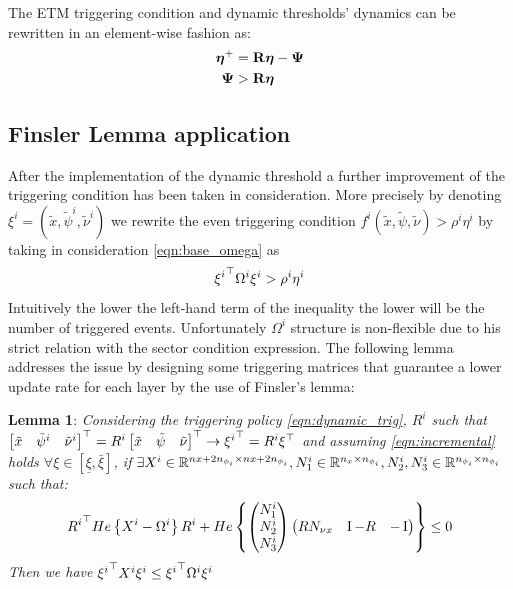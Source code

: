 \documentclass{article}
\begin{document}
The ETM triggering condition and dynamic thresholds' dynamics can be rewritten in an element-wise fashion as:
\begin{equation}
\begin{aligned}
    \boldsymbol{\eta}^+ &= {\bf{R}} \boldsymbol{\eta} - \mathbf{\Psi}\\
    \mathbf{\Psi} &> {\bf{R}} \boldsymbol{\eta}
\end{aligned}
\end{equation}

\subsection{Finsler Lemma application}
After the implementation of the dynamic threshold a further improvement of the triggering condition has been taken in consideration. More precisely by denoting $\xi^i = (\tilde{x}, \tilde{\psi}^i, \tilde{\nu}^i)$ we rewrite the even triggering condition $f^i(\tilde{x}, \tilde{\psi}, \tilde{\nu}) > \rho^i \eta^i$ by taking in consideration \ref{eqn:base_omega} as 
\begin{equation}
    {\xi^i}^\top \Omega^i \xi^i > \rho^i \eta^i
\end{equation}
Intuitively the lower the left-hand term of the inequality the lower will be the number of triggered events. Unfortunately $\Omega^i$ structure is non-flexible due to his strict relation with the sector condition expression. The following lemma addresses the issue by designing some triggering matrices that guarantee a lower update rate for each layer by the use of Finsler's lemma:

\textbf{Lemma 1}: \emph{Considering the triggering policy \ref{eqn:dynamic_trig}, $R^i$ such that $\left[\begin{matrix}\tilde{x} & \tilde{\psi}^i & \tilde{\nu}^i\end{matrix}\right]^\top = R^i \left[\begin{matrix}\tilde{x} & \tilde{\psi} & \tilde{\nu}\end{matrix}\right]^\top \to {\xi^i}^\top = R^i \xi^\top$ and assuming \ref{eqn:incremental} holds $\forall \xi \in \left[ \underline{\xi}, \bar{\xi}\right]$, if $\exists X^i \in {\mathbb{R}}^{nx + 2n_{\phi_i} \times nx + 2n_{\phi_i}}, N^i_1 \in {\mathbb{R}}^{n_x \times n_{\phi_i}}, N^i_2, N^i_3 \in {\mathbb{R}}^{n_{\phi_i} \times n_{\phi_i}}$ such that:
\begin{equation}\label{eqn:finsler}
     {R^i}^\top He\left\{X^i - \Omega^i\right\} R^i + He\left\{ \left(\begin{matrix}N^i_1\\ N^i_2\\ N^i_3\end{matrix}\right) \left(\begin{matrix}R N_{\nu x} & \operatorname{I} - R & -\operatorname{I}\end{matrix}\right)\right\} \leq 0
\end{equation}
Then we have ${\xi^i}^\top X^i \xi^i \leq {\xi^i}^\top \Omega^i \xi^i$}
\end{document}
